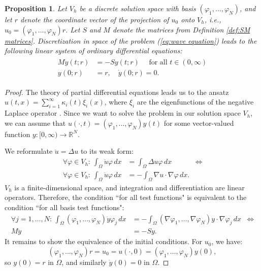 \documentclass[a4paper,11pt,bibliography=totoc,listof=totoc,headinclude=true,cleardoublepage=empty,oneside]{scrbook}
\newtheorem{prop}[theorem]{Proposition}
\newcommand{\R}{\mathbb{R}}
\renewcommand{\eqref}[1]{(\ref{#1})}
\begin{document}
\begin{prop}
    Let $V_h$ be a discrete solution space with basis $(\varphi_1, \dots, \varphi_N)$, and let $r$ denote the coordinate vector of the projection of $u_0$ onto $V_h$, i.e., $u_0 = (\varphi_1, \dots, \varphi_N)r$. Let $S$ and $M$ denote the matrices from Definition \ref{def:SM matrices}. Discretization in space of the problem \eqref{eq:wave equation} leads to the following linear system of ordinary differential equations:
    \begin{align}\label{eq:discr wave equation}
    \begin{split}
        M \ddot{y}(t; r) &= -S y (t; r) \quad \text{ for all } t \in (0, \infty) \\
        y(0; r) &= r, \quad \dot{y}(0; r) = 0. 
    \end{split}
    \end{align}
\end{prop}
\begin{proof}
    The theory of partial differential equations leads us to the ansatz $u(t, x) = \sum_{i=1}^\infty \kappa_i(t) \xi_i(x)$, where $\xi_i$ are the eigenfunctions of the negative Laplace operator \cite[p. 122]{Jungel}. Since we want to solve the problem in our solution space $V_h$, we can assume that $u(\cdot, t)=(\varphi_1, \dots, \varphi_N)y(t)$ for some vector-valued function $y: [0, \infty) \rightarrow \R^N$.

    We reformulate $\ddot{u} = \Delta u$ to its weak form:
    \begin{align*}
        \forall \varphi \in V_h : \, \int_\Omega \ddot{u} \varphi \, dx &= \int_\Omega \Delta u \varphi \, dx &\iff \\
        \forall \varphi \in V_h : \, \int_\Omega \ddot{u} \varphi \, dx &= - \int_\Omega \nabla  u\cdot  \nabla \varphi \, dx.&
    \end{align*}
    $V_h$ is a finite-dimensional space, and integration and differentiation are linear operators. Therefore, the condition ``for all test functions" is equivalent to the condition ``for all basis test functions":
    \begin{align*}
        \forall j=1, \dots, N:\, \int_\Omega (\varphi_1, \dots, \varphi_N)\ddot{y} \varphi_j \, dx &= -  \int_\Omega (\nabla \varphi_1, \dots, \nabla \varphi_N)y\cdot  \nabla \varphi_j \, dx & \iff \\
        M\ddot{y} &= -Sy. &
    \end{align*}
    It remains to show the equivalence of the initial conditions. For $u_0$, we have:
    \begin{equation*}
        (\varphi_1, \dots, \varphi_N)r = u_0 = u(\cdot, 0) = (\varphi_1, \dots, \varphi_N)y(0),
    \end{equation*}
    so $y(0) = r$ in $\Omega$, and similarly $\dot{y}(0) = 0$ in $\Omega$.
\end{proof}
\end{document}
